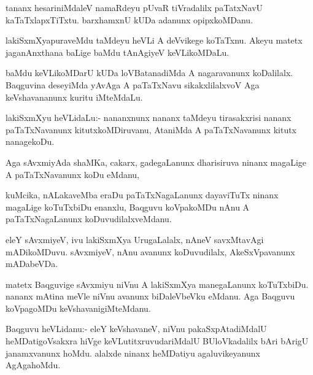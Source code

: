 \documentclass{article}
\begin{document}
\begin{mn}
tananx hesariniMdaleV namaRdeyu pUvaR tiVradalilx paTatxNavU
kaTaTxlapxTiTxtu. barxhamxnU kUDa adanunx opipxkoMDanu.
\end{mn}

\begin{mn}%
lakiSxmXyapuraveMdu taMdeyu heVLi A deVvikege koTaTxnu. Akeyu matetx
jaganAnxthana baLige baMdu tAnAgiyeV keVLikoMDaLu.
\end{mn}

\begin{mn}
baMdu keVLikoMDarU kUDa loVBatanadiMda A nagaravanunx
koDalilalx. Baqguvina deseyiMda yAvAga A paTaTxNavu sikakxlilalxvoV
Aga keVshavananunx kuritu iMteMdaLu.
\end{mn}

\begin{mn}%
lakiSxmXyu heVLidaLu:- nananxnunx nananx taMdeyu tirasakxrisi nananx
paTaTxNavanunx kitutxkoMDiruvanu, AtaniMda A paTaTxNavanunx kitutx
nanagekoDu.
\end{mn}

\begin{mn}%
Aga sAvxmiyAda shaMKa, cakarx, gadegaLanunx dharisiruva ninanx
magaLige A paTaTxNavanunx koDu eMdanu, 
\end{mn}

\begin{mn}
kuMcika, nALakaveMba eraDu paTaTxNagaLanunx dayaviTuTx ninanx magaLige
koTuTxbiDu enanxlu, Baqguvu koVpakoMDu nAnu A paTaTxNagaLanunx koDuvudilalxveMdanu.
\end{mn}

\begin{mn}
eleY sAvxmiyeV, ivu lakiSxmXya UrugaLalalx, nAneV savxMtavAgi
mADikoMDuvu. sAvxmiyeV, nAnu avanunx koDuvudilalx, AkeSxVpavanunx mADabeVDa.
\end{mn}

\begin{mn}%
matetx Baqguvige sAvxmiyu niVnu A lakiSxmXya manegaLanunx
koTuTxbiDu. nananx mAtina meVle niVnu avanunx biDaleVbeVku eMdanu. Aga
Baqguvu koVpagoMDu keVshavanigiMteMdanu.
\end{mn}

\begin{mn}%
Baqguvu heVLidanu:- eleY keVshavaneV, niVnu pakaSxpAtadiMdalU
heMDatigoVsakxra hiVge keVLutitxruvudariMdalU BUloVkadalilx bAri
bArigU janamxvanunx hoMdu. alalxde ninanx heMDatiyu agaluvikeyanunx
AgAgahoMdu.
\end{mn}
\end{document}
